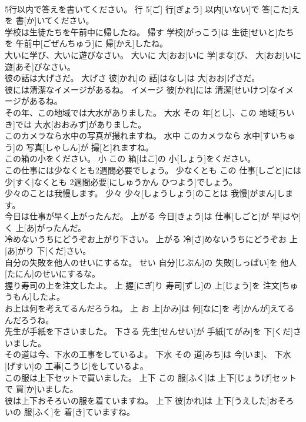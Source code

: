 \documentclass[8pt]{extreport}
\begin{document}
\begin{CJK}{UTF8}{min}
\\	5行以内で答えを書いてください。	行	5[ご] 行[ぎょう] 以内[いない]で 答[こた]えを 書[か]いてください。	
\\	学校は生徒たちを午前中に帰したね。	帰す	学校[がっこう]は 生徒[せいと]たちを 午前中[ごぜんちゅう]に 帰[かえ]したね。	
\\	大いに学び、大いに遊びなさい。	大いに	大[おお]いに 学[まな]び、 大[おお]いに 遊[あそ]びなさい。	
\\	彼の話は大げさだ。	大げさ	彼[かれ]の 話[はなし]は 大[おお]げさだ。	
\\	彼には清潔なイメージがあるね。	イメージ	彼[かれ]には 清潔[せいけつ]なイメージがあるね。	
\\	その年、この地域では大水がありました。	大水	その 年[とし]、この 地域[ちいき]では 大水[おおみず]がありました。	
\\	このカメラなら水中の写真が撮れますね。	水中	このカメラなら 水中[すいちゅう]の 写真[しゃしん]が 撮[と]れますね。	
\\	この箱の小をください。	小	この 箱[はこ]の 小[しょう]をください。	
\\	この仕事には少なくとも2週間必要でしょう。	少なくとも	この 仕事[しごと]には 少[すく]なくとも 2週間必要[にしゅうかん ひつよう]でしょう。	
\\	少々のことは我慢します。	少々	少々[しょうしょう]のことは 我慢[がまん]します。	
\\	今日は仕事が早く上がったんだ。	上がる	今日[きょう]は 仕事[しごと]が 早[はや]く 上[あ]がったんだ。	
\\	冷めないうちにどうぞお上がり下さい。	上がる	冷[さ]めないうちにどうぞお 上[あ]がり 下[くだ]さい。	
\\	自分の失敗を他人のせいにするな。	せい	自分[じぶん]の 失敗[しっぱい]を 他人[たにん]のせいにするな。	
\\	握り寿司の上を注文したよ。	上	握[にぎ]り 寿司[ずし]の 上[じょう]を 注文[ちゅうもん]したよ。	
\\	お上は何を考えてるんだろうね。	上	お 上[かみ]は 何[なに]を 考[かんが]えてるんだろうね。	
\\	先生が手紙を下さいました。	下さる	先生[せんせい]が 手紙[てがみ]を 下[くだ]さいました。	
\\	その道は今、下水の工事をしているよ。	下水	その 道[みち]は 今[いま]、 下水[げすい]の 工事[こうじ]をしているよ。	
\\	この服は上下セットで買いました。	上下	この 服[ふく]は 上下[じょうげ]セットで 買[か]いました。	
\\	彼は上下おそろいの服を着ていますね。	上下	彼[かれ]は 上下[うえした]おそろいの 服[ふく]を 着[き]ていますね。	

\end{CJK}
\end{document}
